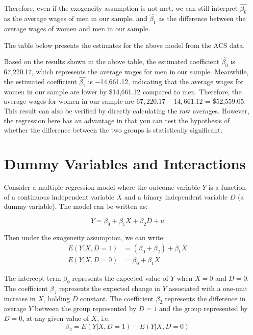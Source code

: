 \documentclass{./../../Latex/handout}
\begin{document}
Therefore, even if the exogeneity assumption is not met, we can still interpret $\hat{\beta_0}$ as the average wages of men in our sample, and $\hat{\beta_1}$ as the difference between the average wages of women and men in our sample.

The table below presents the estimates for the above model from the ACS data. 
\begin{center}
	
\end{center}
Based on the results shown in the above table, the estimated coefficient $\hat{\beta_0}$ is 67,220.17, which represents the average wages for men in our sample. Meanwhile, the estimated coefficient $\hat{\beta_1}$ is $-$14,661.12, indicating that the average wages for women in our sample are lower by \$14,661.12 compared to men. Therefore, the average wages for women in our sample are $67,220.17 - 14,661.12$ = \$52,559.05. This result can also be verified by directly calculating the raw averages. However, the regression here has an advantage in that you can test the hypothesis of whether the difference between the two groups is statistically significant. 

\section{Dummy Variables and Interactions}

Consider a multiple regression model where the outcome variable $Y$ is a function of a continuous independent variable $X$ and a binary independent variable $D$ (a dummy variable). The model can be written as:

$$ Y = \beta_0 + \beta_1 X + \beta_2 D + u $$

Then under the exogeneity assumption, we can write: 
\begin{align*}
E(Y | X, D=1) &= (\beta_0+\beta_2) + \beta_1 X \\
E(Y | X, D=0) &= \beta_0 + \beta_1 X
\end{align*}

The intercept term $\beta_0$ represents the expected value of $Y$ when $X=0$ and $D=0$. The coefficient $\beta_1$ represents the expected change in $Y$ associated with a one-unit increase in $X$, holding $D$ constant. The coefficient $\beta_2$ represents the difference in average $Y$ between the group represented by $D=1$ and the group represented by $D=0$, at any given value of $X$, i.e.
$$ \beta_2 =E(Y | X, D=1)-E(Y | X, D=0)  $$
\end{document}
